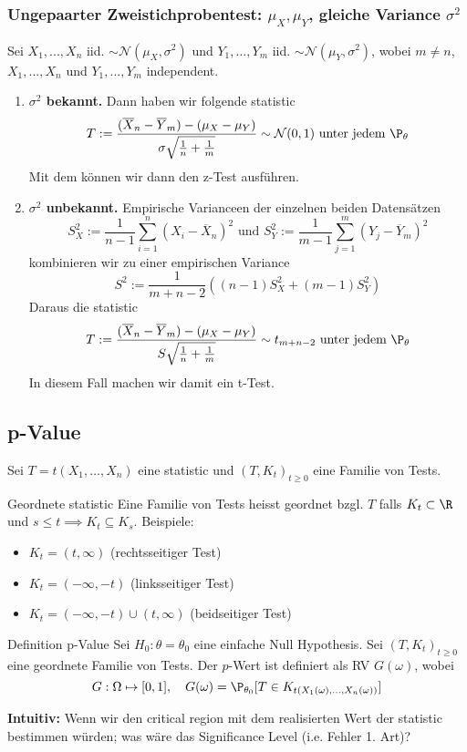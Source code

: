 \subsubsection*{Ungepaarter Zweistichprobentest: $\mu_X, \mu_Y$, gleiche Variance $\sigma^2$}
Sei $X_1, ..., X_n$ iid. $\sim \mathcal{N}(\mu_X, \sigma^2)$ und $Y_1, \dots, Y_m$ iid. $\sim \mathcal{N}(\mu_Y, \sigma^2)$, wobei $m \neq n$, $X_1, ..., X_n$ und  $Y_1, ..., Y_m$ independent.
\begin{enumerate}
	\item \textbf{$\sigma^2$ bekannt.} Dann haben wir folgende statistic
	\[T := \frac{(\overline{X}_n -\overline{Y}_m) - (\mu_X - \mu_Y)}{\sigma\sqrt{\frac{1}{n}+\frac{1}{m}}} \sim \mathcal{N}(0,1) \text{ unter jedem }\P_{\theta}\]
	Mit dem können wir dann den z-Test ausführen.
	\item \textbf{$\sigma^2$ unbekannt.} Empirische Varianceen der einzelnen beiden Datensätzen
	\[S^2_X := \frac{1}{n-1}\sum_{i=1}^n(X_i - \overline{X}_n)^2 \text{ und } S^2_Y := \frac{1}{m-1}\sum_{j=1}^m(Y_j - \overline{Y}_m)^2\]
	kombinieren wir zu einer empirischen Variance
	\[S^2 := \frac{1}{m+n-2}((n-1)S^2_X + (m-1)S_Y^2)\]
	Daraus die statistic
	\[T := \frac{(\overline{X}_n -\overline{Y}_m) - (\mu_X - \mu_Y)}{S\sqrt{\frac{1}{n}+\frac{1}{m}}} \sim t_{m+n-2} \text{ unter jedem }\P_{\theta}\]
	In diesem Fall machen wir damit ein t-Test.
\end{enumerate}
\subsection{p-Value}
Sei \(T = t(X_1, \ldots, X_n)\) eine statistic und \((T,K_t)_{t\ge 0}\) eine Familie von Tests.

\begin{subbox}{Geordnete statistic}
	Eine Familie von Tests heisst geordnet bzgl. \(T\) falls \(K_t \subset \R\) und \(s \le t \implies K_t \subseteq K_s\). Beispiele:
	\begin{itemize}
		\item \(K_t = (t, \infty)\) (rechtsseitiger Test)
		\item \(K_t = (-\infty, -t)\) (linksseitiger Test)
		\item \(K_t = (-\infty, -t) \cup (t, \infty)\) (beidseitiger Test)
	\end{itemize}
\end{subbox}

\begin{mainbox}{Definition p-Value}
	Sei \(H_0: \theta = \theta_0\) eine einfache Null Hypothesis. Sei \((T, K_t)_{t\ge 0}\) eine geordnete Familie von Tests. Der \(p\)-Wert ist definiert als RV \(G(\omega)\), wobei
	\[G: \Omega \mapsto [0,1], \quad G(\omega) = \P_{\theta_0}[T \in K_{t(X_1(\omega), ..., X_n(\omega))}]\]
\end{mainbox}
\textbf{Intuitiv: } Wenn wir den critical region mit dem realisierten Wert der statistic bestimmen würden; was wäre das Significance Level (i.e. Fehler 1. Art)?

